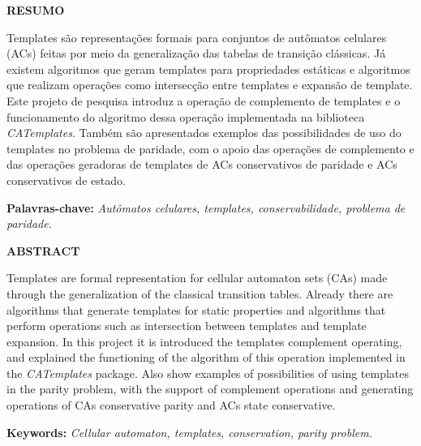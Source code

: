\documentclass[12pt,a4paper]{article}
\begin{document}
\newpage
\thispagestyle{plain}
\begin{center}
\large  
\textbf{RESUMO}
\end{center}
Templates são representações formais para conjuntos de autômatos celulares (ACs) feitas por meio da generalização das tabelas de transição clássicas. Já existem algoritmos que geram templates para propriedades estáticas e algoritmos que realizam operações como intersecção entre templates e expansão de template. Este projeto de pesquisa introduz a operação de complemento de templates e o funcionamento do algoritmo dessa operação implementada na biblioteca \textit{CATemplates}. Também são apresentados exemplos das possibilidades de uso do templates no problema de paridade, com o apoio das operações de complemento e das operações geradoras de templates de ACs conservativos de paridade e ACs conservativos de estado.
\\[0.5cm]
\begin{flushleft}
{\bf Palavras-chave:} {\it Autômatos celulares, templates, conservabilidade, problema de paridade.}
\end{flushleft}

\newpage
\thispagestyle{plain}
\begin{center}
\large  
\textbf{ABSTRACT}
\end{center}
Templates are formal representation for cellular automaton sets (CAs) made through the generalization of the classical transition tables. Already there are algorithms that generate templates for static properties and algorithms that perform operations such as intersection between templates and template expansion. In this project it is introduced the templates complement operating, and explained the functioning of the algorithm of this operation implemented in the \textit{CATemplates} package. Also show examples of possibilities of using templates in the parity problem, with the support of complement operations and generating operations of CAs conservative parity and ACs state conservative.
\\[0.5cm]
\begin{flushleft}
{\bf Keywords:} {\it Cellular automaton, templates, conservation, parity problem.}
\end{flushleft}

\newpage
\thispagestyle{empty}
\tableofcontents

\end{document}
